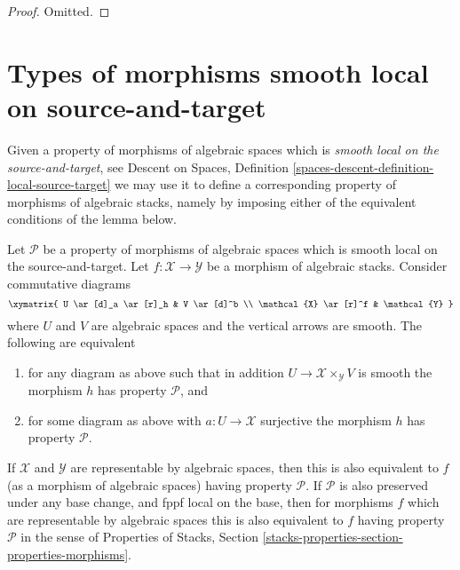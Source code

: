 \begin{proof}
Omitted.
\end{proof}










\section{Types of morphisms smooth local on source-and-target}
\label{section-local-source-target}

\noindent
Given a property of morphisms of algebraic spaces which is
{\it smooth local on the source-and-target}, see
Descent on Spaces,
Definition \ref{spaces-descent-definition-local-source-target}
we may use it to define a corresponding
property of morphisms of algebraic stacks, namely by imposing either of
the equivalent conditions of the lemma below.

\begin{lemma}
\label{lemma-local-source-target}
Let $\mathcal{P}$ be a property of morphisms of algebraic spaces
which is smooth local on the source-and-target.
Let $f : \mathcal{X} \to \mathcal{Y}$ be a morphism of algebraic stacks.
Consider commutative diagrams
$$
\xymatrix{
U \ar[d]_a \ar[r]_h & V \ar[d]^b \\
\mathcal{X} \ar[r]^f & \mathcal{Y}
}
$$
where $U$ and $V$ are algebraic spaces and the vertical arrows are smooth.
The following are equivalent
\begin{enumerate}
\item for any diagram as above such that in addition
$U \to \mathcal{X} \times_\mathcal{Y} V$ is smooth
the morphism $h$ has property $\mathcal{P}$, and
\item for some diagram as above with $a : U \to \mathcal{X}$ surjective
the morphism $h$ has property $\mathcal{P}$.
\end{enumerate}
If $\mathcal{X}$ and $\mathcal{Y}$ are representable by algebraic spaces,
then this is also equivalent to $f$ (as a morphism of algebraic spaces)
having property $\mathcal{P}$. If $\mathcal{P}$ is also preserved under
any base change, and fppf local on the base, then for morphisms $f$
which are representable by algebraic spaces this
is also equivalent to $f$ having property $\mathcal{P}$ in the sense
of
Properties of Stacks,
Section \ref{stacks-properties-section-properties-morphisms}.
\end{lemma}

